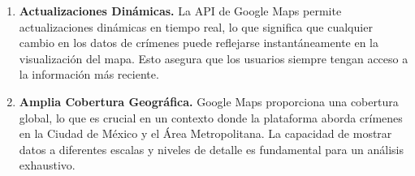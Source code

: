 \documentclass{article}
\begin{document}
\begin{itemize}
\begin{enumerate}
                    \item \textbf{Actualizaciones Dinámicas.} La API de Google Maps permite actualizaciones dinámicas en tiempo real, lo que significa que cualquier cambio en los datos de crímenes puede reflejarse instantáneamente en la visualización del mapa. Esto asegura que los usuarios siempre tengan acceso a la información más reciente.

                    \item \textbf{Amplia Cobertura Geográfica.} Google Maps proporciona una cobertura global, lo que es crucial en un contexto donde la plataforma aborda crímenes en la Ciudad de México y el Área Metropolitana. La capacidad de mostrar datos a diferentes escalas y niveles de detalle es fundamental para un análisis exhaustivo.
                \end{enumerate}
            \end{itemize}
\end{document}
